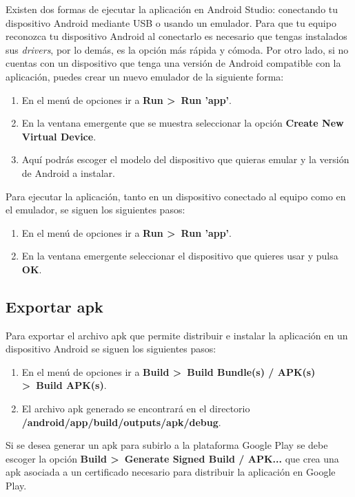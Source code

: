 Existen dos formas de ejecutar la aplicación en Android Studio: conectando tu dispositivo Android mediante USB o usando un emulador. Para que tu equipo reconozca tu dispositivo Android al conectarlo es necesario que tengas instalados sus \textit{drivers}, por lo demás, es la opción más rápida y cómoda. Por otro lado, si no cuentas con un dispositivo que tenga una versión de Android compatible con la aplicación, puedes crear un nuevo emulador de la siguiente forma: 

\begin{enumerate}
	\item En el menú de opciones ir a \textbf{Run >~Run 'app'}. 
	\item En la ventana emergente que se muestra seleccionar la opción \textbf{Create New Virtual Device}. 
	\item Aquí podrás escoger el modelo del dispositivo que quieras emular y la versión de Android a instalar. 
\end{enumerate}

Para ejecutar la aplicación, tanto en un dispositivo conectado al equipo como en el emulador, se siguen los siguientes pasos: 

\begin{enumerate}
	\item En el menú de opciones ir a \textbf{Run >~Run 'app'}.
	\item En la ventana emergente seleccionar el dispositivo que quieres usar y pulsa \textbf{OK}. 
\end{enumerate}

\subsection{Exportar apk}

Para exportar el archivo apk que permite distribuir e instalar la aplicación en un dispositivo Android se siguen los siguientes pasos: 

\begin{enumerate}
	\item En el menú de opciones ir a \textbf{Build >~Build Bundle(s) / APK(s) >~Build APK(s)}. 
	\item El archivo apk generado se encontrará en el directorio \\ \textbf{/android/app/build/outputs/apk/debug}.
\end{enumerate}

Si se desea generar un apk para subirlo a la plataforma Google Play se debe escoger la opción \textbf{Build >~Generate Signed Build / APK...} que crea una apk asociada a un certificado necesario para distribuir la aplicación en Google Play. 

